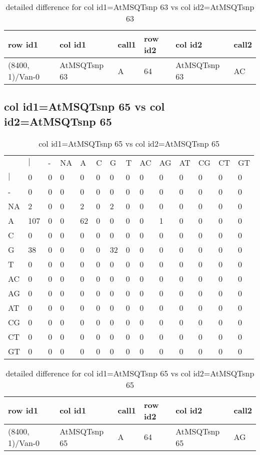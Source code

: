 \begin{center}
\begin{longtable}{|l|l|l|l|l|l|}
\caption{detailed difference for col id1=AtMSQTsnp 63 vs col id2=AtMSQTsnp 63} \label{table_dm763}\\
\hline
row id1&col id1&call1&row id2&col id2&call2\\
\hline
(8400, 1)/Van-0&AtMSQTsnp 63&A&64&AtMSQTsnp 63&AC\\
\hline
\end{longtable}
\end{center}

\subsection{col id1=AtMSQTsnp 65 vs col id2=AtMSQTsnp 65}
\begin{center}
\begin{longtable}{|l|l|l|l|l|l|l|l|l|l|l|l|l|l|}
\caption{col id1=AtMSQTsnp 65 vs col id2=AtMSQTsnp 65} \label{table_dm764}\\
\hline
\\
\hline
&$|$&-&NA&A&C&G&T&AC&AG&AT&CG&CT&GT\\
$|$&0&0&0&0&0&0&0&0&0&0&0&0&0\\
-&0&0&0&0&0&0&0&0&0&0&0&0&0\\
NA&2&0&0&2&0&2&0&0&0&0&0&0&0\\
A&107&0&0&62&0&0&0&0&1&0&0&0&0\\
C&0&0&0&0&0&0&0&0&0&0&0&0&0\\
G&38&0&0&0&0&32&0&0&0&0&0&0&0\\
T&0&0&0&0&0&0&0&0&0&0&0&0&0\\
AC&0&0&0&0&0&0&0&0&0&0&0&0&0\\
AG&0&0&0&0&0&0&0&0&0&0&0&0&0\\
AT&0&0&0&0&0&0&0&0&0&0&0&0&0\\
CG&0&0&0&0&0&0&0&0&0&0&0&0&0\\
CT&0&0&0&0&0&0&0&0&0&0&0&0&0\\
GT&0&0&0&0&0&0&0&0&0&0&0&0&0\\
\hline
\end{longtable}
\end{center}

\begin{center}
\begin{longtable}{|l|l|l|l|l|l|}
\caption{detailed difference for col id1=AtMSQTsnp 65 vs col id2=AtMSQTsnp 65} \label{table_dm765}\\
\hline
row id1&col id1&call1&row id2&col id2&call2\\
\hline
(8400, 1)/Van-0&AtMSQTsnp 65&A&64&AtMSQTsnp 65&AG\\
\hline
\end{longtable}
\end{center}

